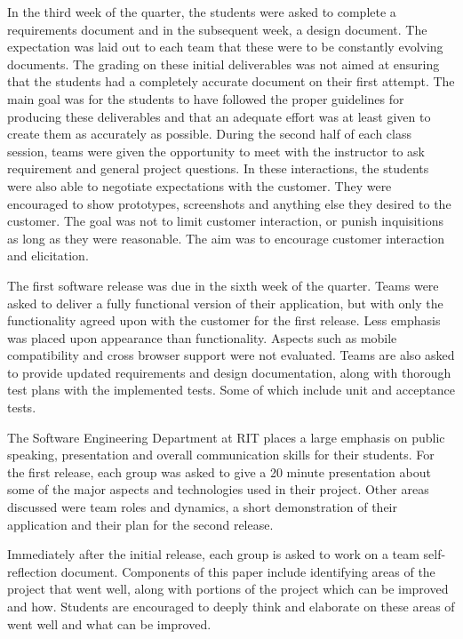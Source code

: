 \documentclass[conference]{IEEEtran}
\begin{document}
In the third week of the quarter, the students were asked to complete a requirements document and in the subsequent week, a design document. The expectation was laid out to each team that these were to be constantly evolving documents. The grading on these initial deliverables was not aimed at ensuring that the students had a completely accurate document on their first attempt. The main goal was for the students to have followed the proper guidelines for producing these deliverables and that an adequate effort was at least given to create them as accurately as possible. During the second half of each class session, teams were given the opportunity to meet with the instructor to ask requirement and general project questions. In these interactions, the students were also able to negotiate expectations with the customer. They were encouraged to show prototypes, screenshots and anything else they desired to the customer. The goal was not to limit customer interaction, or punish inquisitions as long as they were reasonable. The aim was to encourage customer interaction and elicitation.

The first software release was due in the sixth week of the quarter. Teams were asked to deliver a fully functional version of their application, but with only the functionality agreed upon with the customer for the first release. Less emphasis was placed upon appearance than functionality. Aspects such as mobile compatibility and cross browser support were not evaluated. Teams are also asked to provide updated requirements and design documentation, along with thorough test plans with the implemented tests. Some of which include unit and acceptance tests.

The Software Engineering Department at RIT places a large emphasis on public speaking, presentation and overall communication skills for their students. For the first release, each group was asked to give a 20 minute presentation about some of the major aspects and technologies used in their project. Other areas discussed were team roles and dynamics, a short demonstration of their application and their plan for the second release.

Immediately after the initial release, each group is asked to work on a team self-reflection document. Components of this paper include identifying areas of the project that went well, along with portions of the project which can be improved and how. Students are encouraged to deeply think and elaborate on these areas of went well and what can be improved.
\end{document}
